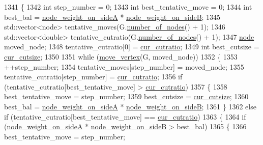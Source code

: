 \begin{DoxyCode}
1341 \{
1342     \textcolor{keywordtype}{int} step\_number = 0;
1343     \textcolor{keywordtype}{int} best\_tentative\_move = 0;
1344     \textcolor{keywordtype}{int} best\_bal = \mbox{\hyperlink{classratio__cut__partition_af1b839e48e498cf8ca93c8ec5df8a686}{node\_weight\_on\_sideA}} * 
      \mbox{\hyperlink{classratio__cut__partition_aa16d1b508db86eb0ba4824642394999a}{node\_weight\_on\_sideB}};
1345     std::vector<node> tentative\_moves(G.\mbox{\hyperlink{classgraph_a42c78e0a9f115655e3ff0efe35ebfc4e}{number\_of\_nodes}}() + 1);
1346     std::vector<double> tentative\_cutratio(G.\mbox{\hyperlink{classgraph_a42c78e0a9f115655e3ff0efe35ebfc4e}{number\_of\_nodes}}() + 1);
1347     \mbox{\hyperlink{classnode}{node}} moved\_node;
1348     tentative\_cutratio[0] = \mbox{\hyperlink{classratio__cut__partition_a9dad324884cef5bcdd50122fc98e0860}{cur\_cutratio}};
1349     \textcolor{keywordtype}{int} best\_cutsize = \mbox{\hyperlink{classratio__cut__partition_aa01f2d6257fff28739e2431fe826ef71}{cur\_cutsize}};
1350 
1351     \textcolor{keywordflow}{while} (\mbox{\hyperlink{classratio__cut__partition_a2dbe8b4e73ac88fe6a9a2403ca35eb3f}{move\_vertex}}(G, moved\_node))
1352     \{
1353     ++step\_number;
1354     tentative\_moves[step\_number] = moved\_node;
1355     tentative\_cutratio[step\_number] = \mbox{\hyperlink{classratio__cut__partition_a9dad324884cef5bcdd50122fc98e0860}{cur\_cutratio}};
1356     \textcolor{keywordflow}{if} (tentative\_cutratio[best\_tentative\_move] > \mbox{\hyperlink{classratio__cut__partition_a9dad324884cef5bcdd50122fc98e0860}{cur\_cutratio}})
1357     \{
1358         best\_tentative\_move = step\_number;
1359         best\_cutsize = \mbox{\hyperlink{classratio__cut__partition_aa01f2d6257fff28739e2431fe826ef71}{cur\_cutsize}};
1360         best\_bal = \mbox{\hyperlink{classratio__cut__partition_af1b839e48e498cf8ca93c8ec5df8a686}{node\_weight\_on\_sideA}} * 
      \mbox{\hyperlink{classratio__cut__partition_aa16d1b508db86eb0ba4824642394999a}{node\_weight\_on\_sideB}};
1361     \}
1362     \textcolor{keywordflow}{else} \textcolor{keywordflow}{if} (tentative\_cutratio[best\_tentative\_move] == \mbox{\hyperlink{classratio__cut__partition_a9dad324884cef5bcdd50122fc98e0860}{cur\_cutratio}})
1363     \{
1364         \textcolor{keywordflow}{if} (\mbox{\hyperlink{classratio__cut__partition_af1b839e48e498cf8ca93c8ec5df8a686}{node\_weight\_on\_sideA}} * \mbox{\hyperlink{classratio__cut__partition_aa16d1b508db86eb0ba4824642394999a}{node\_weight\_on\_sideB}} > best\_bal)
1365         \{
1366         best\_tentative\_move = step\_number;

\end{DoxyCode}
